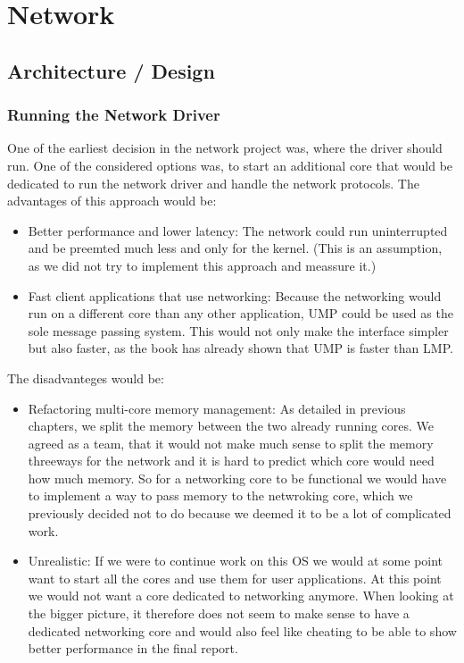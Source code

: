 \chapter{Network}

\section{Architecture / Design}

\subsection{Running the Network Driver}

One of the earliest decision in the network project was, where the driver should run. One of the considered options was, to start an additional core that would be dedicated to run the network driver and handle the network protocols. The advantages of this approach would be:
\begin{itemize}
    \item Better performance and lower latency: The network could run uninterrupted and be preemted much less and only for the kernel. (This is an assumption, as we did not try to implement this approach and meassure it.)
    \item Fast client applications that use networking: Because the networking would run on a different core than any other application, UMP could be used as the sole message passing system. This would not only make the interface simpler but also faster, as the book has already shown that UMP is faster than LMP.
\end{itemize}
The disadvanteges would be:
\begin{itemize}
    \item Refactoring multi-core memory management: As detailed in previous chapters, we split the memory between the two already running cores. We agreed as a team, that it would not make much sense to split the memory threeways for the network and it is hard to predict which core would need how much memory. So for a networking core to be functional we would have to implement a way to pass memory to the netwroking core, which we previously decided not to do because we deemed it to be a lot of complicated work.
    \item Unrealistic: If we were to continue work on this OS we would at some point want to start all the cores and use them for user applications. At this point we would not want a core dedicated to networking anymore. When looking at the bigger picture, it therefore does not seem to make sense to have a dedicated networking core and would also feel like cheating to be able to show better performance in the final report.
\end{itemize}

